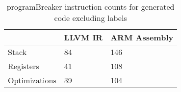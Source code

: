\begin{table}[h!]
\centering
\begin{tabular}{p{}p{}p{}}
  \hline
 & LLVM IR & ARM Assembly \\ 
  \hline
Stack &  84 & 146 \\ 
  Registers &  41 & 108 \\ 
  Optimizations &  39 & 104 \\ 
   \hline
\end{tabular}
\caption{programBreaker instruction counts for generated code excluding labels}
\end{table}
